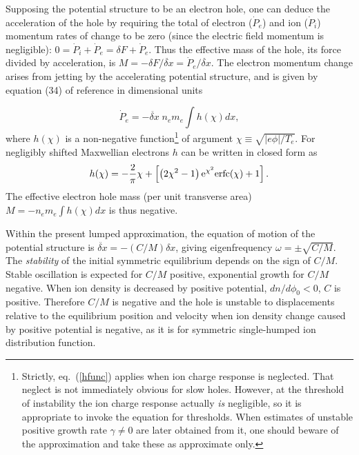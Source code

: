 \documentclass[pre]{revtex4-2}
\begin{document}
Supposing the potential structure to be an electron hole, one can
deduce the acceleration of the hole by requiring the total of electron
($\dot P_e$) and ion ($\dot P_i$) momentum rates of change to be zero
(since the electric field momentum is negligible):
$0=\dot P_i+\dot P_e=\delta F +\dot P_e$. Thus the effective mass of
the hole, its force divided by acceleration, is
$M=-\delta F/\ddot{\delta x}=\dot P_e/\ddot{\delta x}$. The electron
momentum change arises from jetting by the accelerating potential
structure, and is given by equation (34) of reference\cite{Hutchinson2016}
in dimensional units

\begin{equation}
  \dot P_e = - \ddot{\delta x}\;n_e m_e\int h(\chi) dx ,
\end{equation}
where $h(\chi)$ is a non-negative function\footnote{Strictly, eq.\
  (\ref{hfunc}) applies when ion charge response is neglected. That
  neglect is not immediately obvious for slow holes. However, at the
  threshold of instability the ion charge response actually \emph{is}
  negligible, so it is appropriate to invoke the equation for
  thresholds. When estimates of unstable positive growth rate
  $\gamma\not=0$ are later obtained from it, one should beware of the
  approximation and take these as approximate only.} of argument
$\chi\equiv\sqrt{|e\phi|/T_e}$. For negligibly shifted Maxwellian
electrons $h$ can be written in closed form as
\begin{equation}\label{hfunc}
  h(\chi)=-{2\over \pi}\chi +\left[\left(2\chi^2-1\right){\rm e}^{\chi^2}{\rm
      erfc}(\chi)+1  \right].
\end{equation}
The effective electron hole mass (per unit transverse area)
$M=- n_em_e \int h(\chi) dx$ is thus negative.


Within the present lumped approximation, the equation of motion of the
potential structure is $\ddot{\delta x}=-(C/M)\delta x$, giving
eigenfrequency $\omega =\pm\sqrt{C/M}$. The \emph{stability} of the
initial symmetric equilibrium depends on the sign of $C/M$.  Stable
oscillation is expected for $C/M$ positive, exponential growth for
$C/M$ negative.  When ion density is decreased by positive
potential, $dn/d\phi_0<0$, $C$ is positive.  Therefore $C/M$ is negative
and the hole is unstable to displacements relative to the equilibrium
position and velocity when ion density change caused by positive
potential is negative, as it is for symmetric single-humped ion
distribution function.
\end{document}
